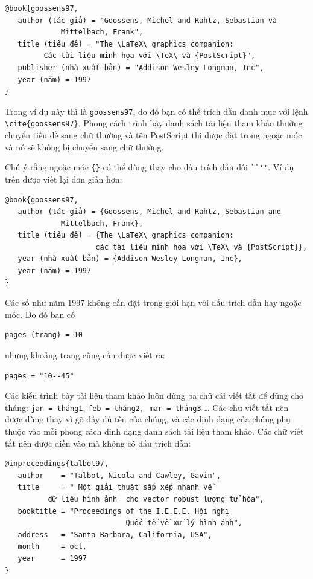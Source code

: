 \documentclass[a4paper]{report}
\begin{document}
\begin{verbatim}
@book{goossens97,
   author (tác giả) = "Goossens, Michel and Rahtz, Sebastian và
             Mittelbach, Frank",
   title (tiêu đề) = "The \LaTeX\ graphics companion: 
         Các tài liệu minh họa với \TeX\ và {PostScript}",
   publisher (nhà xuất bản) = "Addison Wesley Longman, Inc",
   year (năm) = 1997
}
\end{verbatim}
Trong ví dụ này thì  là \verb|goossens97|, do đó bạn có thể trích dẫn danh mục với lệnh \verb|\cite{goossens97}|. Phong cách trình bày danh sách tài liệu tham khảo thường chuyển tiêu đề sang chữ thường và tên PostScript thì được đặt trong ngoặc móc  và nó sẽ không bị chuyển sang chữ thường.

Chú ý rằng ngoặc móc \verb|{}| có thể dùng thay cho dấu trích dẫn đôi \verb|``''|. Ví dụ trên được viết lại đơn giản hơn:

\begin{verbatim}
@book{goossens97,
   author (tác giả) = {Goossens, Michel and Rahtz, Sebastian and
             Mittelbach, Frank},
   title (tiêu đề) = {The \LaTeX\ graphics companion: 
                     các tài liệu minh họa với \TeX\ và {PostScript}},
   year (nhà xuất bản) = {Addison Wesley Longman, Inc},
   year (năm) = 1997
}
\end{verbatim}

Các số như năm 1997 không cần đặt trong giới hạn với dấu trích dẫn hay ngoặc móc.
Do đó bạn có
\begin{verbatim}
pages (trang) = 10
\end{verbatim}
nhưng khoảng trang cũng cần được viết ra:
\begin{verbatim}
pages = "10--45"
\end{verbatim}

Các kiểu trình bày tài liệu tham khảo luôn dùng ba chữ cái viết tắt để dùng cho tháng: \texttt{jan = tháng1}, \texttt{feb = tháng2},  \texttt{ mar = tháng3} \ldots
Các chữ viết tắt nên được dùng thay vì gõ đầy đủ tên của chúng, và các định dạng của chúng phụ thuộc vào mỗi phong cách định dạng danh sách tài liệu tham khảo. Các chữ viết tắt nên được điền vào mà không có dấu trích dẫn:
 
\begin{verbatim}
@inproceedings{talbot97,
   author    = "Talbot, Nicola and Cawley, Gavin",
   title     = " Một giải thuật sắp xếp nhanh về
		  dữ liệu hình ảnh  cho vector robust lượng tử hóa",
   booktitle = "Proceedings of the I.E.E.E. Hội nghị
                            Quốc tế về xử lý hình ảnh",
   address   = "Santa Barbara, California, USA",
   month     = oct,
   year      = 1997
}
\end{verbatim}
\end{document}
